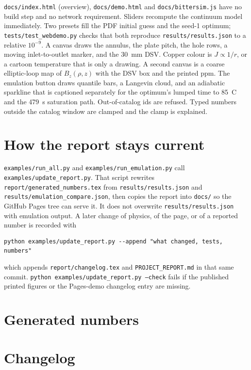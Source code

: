 \documentclass[11pt]{article}
\begin{document}
\texttt{docs/index.html} (overview), \texttt{docs/demo.html} and \texttt{docs/bittersim.js} have no build step and no network requirement.
Sliders recompute the continuum model immediately.
Two presets fill the PDF initial guess and the seed-1 optimum; \texttt{tests/test\_webdemo.py} checks that both reproduce \texttt{results/results.json} to a relative $10^{-9}$.
A canvas draws the annulus, the plate pitch, the hole rows, a moving inlet-to-outlet marker, and the 30~mm DSV.
Copper colour is $J\propto 1/r$, or a cartoon temperature that is only a drawing.
A second canvas is a coarse elliptic-loop map of $B_z(\rho,z)$ with the DSV box and the printed ppm.
The emulation button draws quantile bars, a Langevin cloud, and an adiabatic sparkline that is captioned separately for the optimum's lumped time to 85~C and the 479~s saturation path.
Out-of-catalog ids are refused.
Typed numbers outside the catalog window are clamped and the clamp is explained.

\section{How the report stays current}

\texttt{examples/run\_all.py} and \texttt{examples/run\_emulation.py} call \texttt{examples/update\_report.py}.
That script rewrites \texttt{report/generated\_numbers.tex} from \texttt{results/results.json} and \texttt{results/emulation\_compare.json}, then copies the report into \texttt{docs/} so the GitHub Pages tree can serve it.
It does not overwrite \texttt{results/results.json} with emulation output.
A later change of physics, of the page, or of a reported number is recorded with
\begin{verbatim}
python examples/update_report.py --append "what changed, tests, numbers"
\end{verbatim}
which appends \texttt{report/changelog.tex} and \texttt{PROJECT\_REPORT.md} in that same commit.
\texttt{python examples/update\_report.py --check} fails if the published printed figures or the Pages-demo changelog entry are missing.

\section{Generated numbers}


\section{Changelog}

\end{document}
